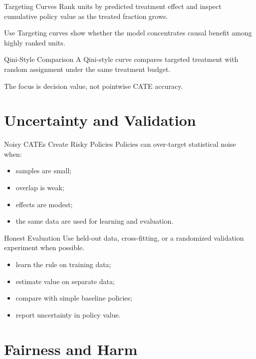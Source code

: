 \documentclass[aspectratio=169,11pt]{beamer}
\begin{document}
\begin{frame}{Targeting Curves}
Rank units by predicted treatment effect and inspect cumulative policy value as the treated fraction grows.

\begin{block}{Use}
Targeting curves show whether the model concentrates causal benefit among highly ranked units.
\end{block}
\end{frame}

\begin{frame}{Qini-Style Comparison}
A Qini-style curve compares targeted treatment with random assignment under the same treatment budget.

The focus is decision value, not pointwise CATE accuracy.
\end{frame}

\section{Uncertainty and Validation}

\begin{frame}{Noisy CATEs Create Risky Policies}
Policies can over-target statistical noise when:
\begin{itemize}
\item samples are small;
\item overlap is weak;
\item effects are modest;
\item the same data are used for learning and evaluation.
\end{itemize}
\end{frame}

\begin{frame}{Honest Evaluation}
Use held-out data, cross-fitting, or a randomized validation experiment when possible.

\begin{itemize}
\item learn the rule on training data;
\item estimate value on separate data;
\item compare with simple baseline policies;
\item report uncertainty in policy value.
\end{itemize}
\end{frame}

\section{Fairness and Harm}
\end{document}
